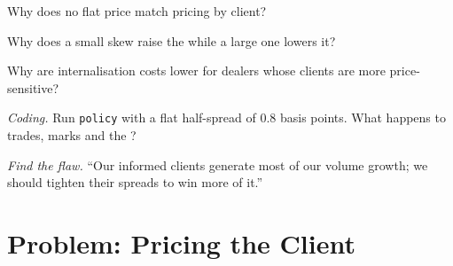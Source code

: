 \begin{exercise}[$\star\star$]\label{exo:s2:flow-market-making-at-a-bank:4}
Why does no flat price match pricing by client?
\end{exercise}

\begin{exercise}[$\star\star$]\label{exo:s2:flow-market-making-at-a-bank:5}
Why does a small skew raise the  while a large one lowers it?
\end{exercise}

\begin{exercise}[$\star\star$]\label{exo:s2:flow-market-making-at-a-bank:6}
Why are internalisation costs lower for dealers whose clients are more price-sensitive?
\end{exercise}

\begin{exercise}[$\star\star\star$]\label{exo:s2:flow-market-making-at-a-bank:7}
\emph{Coding.} Run \texttt{policy} with a flat half-spread of 0.8 basis points. What happens to trades, marks and the ?
\end{exercise}

\begin{exercise}[$\star\star\star$]\label{exo:s2:flow-market-making-at-a-bank:8}
\emph{Find the flaw.} ``Our informed clients generate most of our volume growth; we should tighten their spreads to win more of it.''
\end{exercise}

\section{Problem: Pricing the Client}

